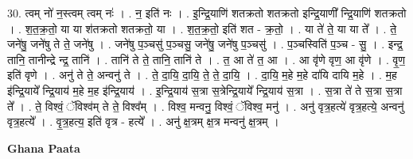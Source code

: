 \documentclass[17pt]{extarticle}
\begin{document}
30. त्वम् नो॑ न॒स्त्वम् त्वम् नः॑ । . न॒ इति॑ नः । . इ॒न्द्रि॒याणि॑ शतक्रतो शतक्रतो इन्द्रि॒याणी᳚ न्द्रि॒याणि॑ शतक्रतो । . श॒त॒क्र॒तो॒ या या श॑तक्रतो शतक्रतो॒ या । . श॒त॒क्र॒तो॒ इति॑ शत - क्र॒तो॒ । . या ते॑ ते॒ या या ते᳚ । . ते॒ जने॑षु॒ जने॑षु ते ते॒ जने॑षु । . जने॑षु प॒ञ्चसु॑ प॒ञ्चसु॒ जने॑षु॒ जने॑षु प॒ञ्चसु॑ । . प॒ञ्चस्विति॑ प॒ञ्च - सु॒ । . इन्द्र॒ तानि॒ तानीन्द्रे न्द्र॒ तानि॑ । . तानि॑ ते ते॒ तानि॒ तानि॑ ते । . त॒ आ ते॑ त॒ आ । . आ वृ॑णे वृण॒ आ वृ॑णे । . वृ॒ण॒ इति॑ वृणे । . अनु॑ ते ते॒ अन्वनु॑ ते । . ते॒ दा॒यि॒ दा॒यि॒ ते॒ ते॒ दा॒यि॒ । . दा॒यि॒ म॒हे म॒हे दा॑यि दायि म॒हे । . म॒ह इ॑न्द्रि॒याये᳚ न्द्रि॒याय॑ म॒हे म॒ह इ॑न्द्रि॒याय॑ । . इ॒न्द्रि॒याय॑ स॒त्रा स॒त्रेन्द्रि॒याये᳚ न्द्रि॒याय॑ स॒त्रा । . स॒त्रा ते॑ ते स॒त्रा स॒त्रा ते᳚ । . ते॒ विश्वं॒ ॅविश्व॑म् ते ते॒ विश्व᳚म् । . विश्व॒ मन्वनु॒ विश्वं॒ ॅविश्व॒ मनु॑ । . अनु॑ वृत्र॒हत्ये॑ वृत्र॒हत्ये॒ अन्वनु॑ वृत्र॒हत्ये᳚ । . वृ॒त्र॒हत्य॒ इति॑ वृत्र - हत्ये᳚ । . अनु॑ क्ष॒त्रम् क्ष॒त्र मन्वनु॑ क्ष॒त्रम् । \newline

\textbf{Ghana Paata } \newline
\end{document}
